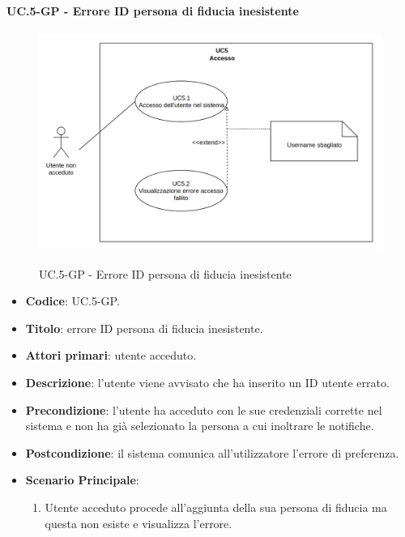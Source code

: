 			\paragraph{UC\theuccount.5-GP - Errore ID persona di fiducia inesistente}
				\begin{figure}[H]
					\centering
					\includegraphics[width=\columnwidth]{img/UC5.png}\\
					\caption{UC\theuccount.5-GP - Errore ID persona di fiducia inesistente}
				\end{figure}
				\begin{itemize}
					\item \textbf{Codice}: UC\theuccount.5-GP.
					\item \textbf{Titolo}: errore ID persona di fiducia inesistente.
					\item \textbf{Attori primari}: utente acceduto.
					\item \textbf{Descrizione}: l’utente viene avvisato che ha inserito un ID utente errato.
					\item \textbf{Precondizione}: l’utente ha acceduto con le sue credenziali corrette nel
					sistema e non ha già selezionato la persona a cui inoltrare le notifiche.
					\item \textbf{Postcondizione}: il sistema comunica all’utilizzatore l’errore di preferenza.
					\item \textbf{Scenario Principale}:
					\begin{enumerate}
						\item Utente acceduto procede all'aggiunta della sua persona di fiducia ma questa non esiste e
						visualizza l'errore.
					\end{enumerate}
				\end{itemize}
			

